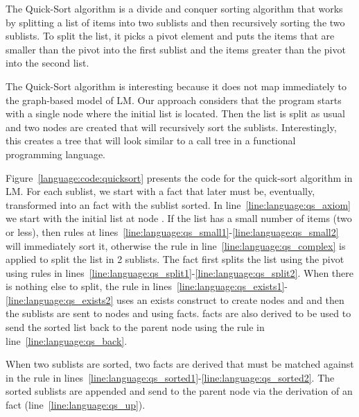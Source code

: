 The Quick-Sort algorithm is a divide and conquer sorting algorithm that works by
splitting a list of items into two sublists and then recursively sorting the two
sublists. To split the list, it picks a pivot element and puts the items that are
smaller than the pivot into the first sublist and the items greater than the pivot
into the second list.

The Quick-Sort algorithm is interesting because it does not map immediately to
the graph-based model of LM. Our approach considers that the program starts with
a single node where the initial list is located. Then the list is split as usual
and two nodes are created that will recursively sort the sublists.
Interestingly, this creates a tree that will look similar to a call tree in a
functional programming language.

Figure~\ref{language:code:quicksort} presents the code for the quick-sort
algorithm in LM. For each sublist, we start with a  fact that later
must be, eventually, transformed into an  fact with the sublist sorted.
In line~\ref{line:language:qs_axiom} we start with the initial list at node
. If the list has a small number of items (two or less), then rules at
lines~\ref{line:language:qs_small1}-\ref{line:language:qs_small2} will
immediately sort it, otherwise the rule in line~\ref{line:language:qs_complex}
is applied to split the list in 2 sublists. The fact  first splits
the list using the pivot  using rules in
lines~\ref{line:language:qs_split1}-\ref{line:language:qs_split2}.  When there
is nothing else to split, the rule in
lines~\ref{line:language:qs_exists1}-\ref{line:language:qs_exists2} uses an
exists construct to create nodes  and  and then the sublists are
sent to nodes  and  using  facts.   facts
are also derived to be used to send the sorted list back to the parent node
using the rule in line~\ref{line:language:qs_back}.

When two sublists are sorted, two  facts are derived that must be
matched against  in the rule in
lines~\ref{line:language:qs_sorted1}-\ref{line:language:qs_sorted2}. The sorted
sublists are appended and send  to the parent node via the derivation
of an  fact (line~\ref{line:language:qs_up}).

